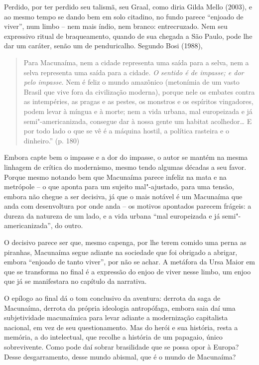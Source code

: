 Perdido, por ter perdido seu talismã, seu Graal, como diria Gilda Mello
(2003), e ao mesmo tempo se dando bem em solo citadino, no fundo parece
``enjoado de viver'', num limbo -- nem mais índio, nem branco:
entrecruzado. Nem seu expressivo ritual de braqueamento, quando de sua
chegada a São Paulo, pode lhe dar um caráter, senão um de penduricalho.
Segundo Bosi (1988),

\begin{quote}
Para Macunaíma, nem a cidade representa uma saída para a selva, nem a
selva representa uma saída para a cidade. \emph{O sentido é de impasse;
e dor pelo impasse}. Nem é feliz o mundo amazônico (metonímia de um
vasto Brasil que vive fora da civilização moderna), porque nele os
embates contra as intempéries, as pragas e as pestes, os monstros e os
espíritos vingadores, podem levar à míngua e à morte; nem a vida urbana,
mal europeizada e já semi"-americanizada, consegue dar à nossa gente um
habitat acolhedor\ldots{} E por todo lado o que se vê é a máquina hostil, a
política rasteira e o dinheiro.'' (p. 180)
\end{quote}

Embora capte bem o impasse e a dor do impasse, o autor se mantém na
mesma linhagem de crítica do modernismo, mesmo tendo algumas décadas a
seu favor. Porque mesmo notando bem que Macunaíma parece infeliz na mata
e na metrópole -- o que aponta para um sujeito mal"-ajustado, para uma
tensão, embora não chegue a ser decisiva, já que o mais notável é um
Macunaíma que anda com desenvoltura por onde anda -- os motivos
apontados parecem frágeis: a dureza da natureza de um lado, e a vida
urbana ``mal europeizada e já semi"-americanizada'', do outro.

O decisivo parece ser que, mesmo capenga, por lhe terem comido uma perna
as piranhas, Macunaíma segue adiante na sociedade que foi obrigado a
abrigar, embora ``enjoado de tanto viver'', por não se achar. A metáfora
da Ursa Maior em que se transforma no final é a expressão do enjoo de
viver nesse limbo, um enjoo que já se manifestara no capítulo  da
narrativa.

O epílogo ao final dá o tom conclusivo da aventura: derrota da saga de
Macunaíma, derrota da própria ideologia antropófaga, embora saia daí uma
subjetividade macunaímica para levar adiante a modernização capitalista
nacional, em vez de seu questionamento. Mas do herói e sua história,
resta a memória, a do intelectual, que recolhe a história de um
papagaio, único sobrevivente. Como pode daí sobrar brasilidade que se
possa opor à Europa? Desse desgarramento, desse mundo abismal, que é o
mundo de Macunaíma?

